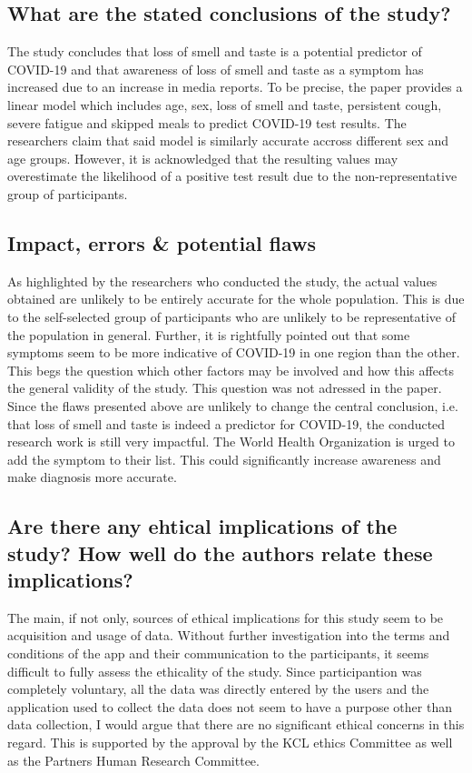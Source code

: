 \documentclass{article}
\begin{document}
\subsection{What are the stated conclusions of the study?}

The study concludes that loss of smell and taste is a potential predictor of COVID-19
and that awareness of loss of smell and taste as a symptom has increased due to
an increase in media reports. To be precise, the paper provides a linear model which includes age,
sex, loss of smell and taste, persistent cough, severe fatigue and skipped meals to
predict COVID-19 test results. The researchers claim that said model is similarly accurate
accross different sex and age groups. However, it is acknowledged that the resulting
values may overestimate the likelihood of a positive test result due to the non-representative
group of participants.

\subsection{Impact, errors \& potential flaws}

As highlighted by the researchers who conducted the study, the actual values
obtained are unlikely to be entirely accurate for the whole population. This is
due to the self-selected group of participants who are unlikely to be representative
of the population in general. Further, it is rightfully pointed out that
some symptoms seem to be more indicative of COVID-19 in one region than the other.
This begs the question which other factors may be involved and how this affects
the general validity of the study. This question was not adressed in the paper.\\
\indent Since the flaws presented above are unlikely to change the central conclusion,
i.e. that loss of smell and taste is indeed a predictor for COVID-19, the
conducted research work is still very impactful. The World Health Organization
is urged to add the symptom to their list. This could significantly increase
awareness and make diagnosis more accurate.

\subsection{Are there any ehtical implications of the study? How well do the authors relate these implications?}

The main, if not only, sources of ethical implications for this study seem to be acquisition and
usage of data. Without further investigation into the terms and conditions
of the app and their communication to the participants, it seems difficult
to fully assess the ethicality of the study. Since participantion was completely
voluntary, all the data was directly entered by the users and the application
used to collect the data does not seem to have a purpose other than data collection,
I would argue that there are no significant ethical concerns in this regard.
This is supported by the approval by the KCL ethics Committee as well as the
Partners Human Research Committee.
\end{document}
